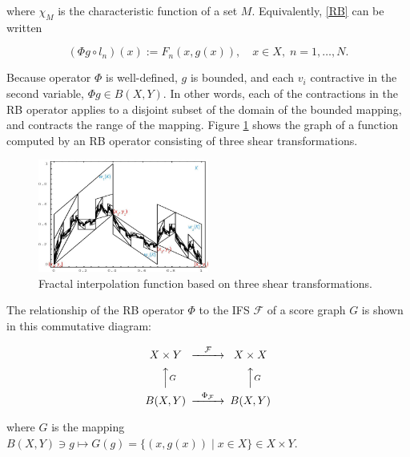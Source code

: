 \documentclass[english,11pt,letterpaper,onecolumn]{scrartcl}
\numberwithin{equation}{section}
\newcommand{\cF}{\mathcal{F}}
\newcommand{\be}{\begin{equation}}
\newcommand{\ee}{\end{equation}}
\begin{document}
\noindent where $\chi_M$ is the characteristic function of a set $M$.
Equivalently, \eqref{RB} can be written

\be\label{3.3}
(\Phi g \circ l_n) (x) := F_n (x, g(x)),\quad x\in X, \;n = 1, \ldots, N.
\ee

\noindent Because operator $\Phi$ is well-defined, $g$ is bounded, and each
$v_i$ contractive in the second variable, $\Phi g\in B(X,Y)$.  In other words,
each of the contractions in the RB operator applies to a disjoint subset of the
domain of the bounded mapping, and contracts the range of the mapping. Figure
\ref{fig:fif} shows the graph of a function computed by an RB operator
consisting of three shear transformations.

\begin{figure}
\centerline{\includegraphics[width = 0.5\textwidth]{shearInterpolation}}
\caption{\label{fig:fif}Fractal interpolation function based on three shear
transformations.\protect\footnotemark}
\end{figure}


The relationship of the RB operator $\Phi$ to the IFS $\cF$ of a score graph
$G$ is shown in this commutative diagram:


\be\label{Phi}
\begin{CD}
X\times Y @>\cF>> X\times X\\
@AAGA                  @AAGA\\
B(X,Y) @>\Phi_\cF>>  B(X,Y)
\end{CD}
\ee

\noindent where $G$ is the mapping $B(X,Y)\ni g\longmapsto G(g) = \{(x,
g(x))\mid x\in X\}\in X\times Y$.
\end{document}

